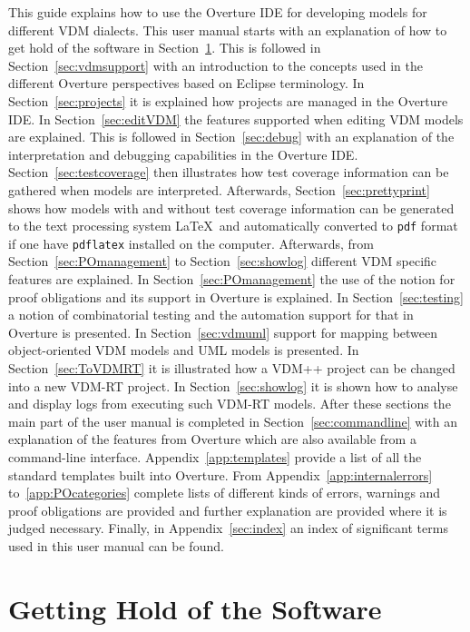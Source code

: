 \documentclass{overturerepsec}
\begin{document}
This guide explains how to use the Overture IDE for developing models
for different VDM dialects. This user manual starts with an explanation
of how to get hold of the software in
Section~\ref{sec:install}. This is followed in
Section~\ref{sec:vdmsupport} with an introduction to the concepts used
in the different Overture perspectives based on Eclipse
terminology. In Section~\ref{sec:projects} it is explained how
projects are managed in the Overture IDE. In Section~\ref{sec:editVDM}
the features supported when editing VDM models are explained. This is
followed in Section~\ref{sec:debug} with an explanation of the
interpretation and debugging capabilities in the Overture
IDE. Section~\ref{sec:testcoverage} then illustrates how test coverage
information can be gathered when models are interpreted. Afterwards,
Section~\ref{sec:prettyprint} shows how models with and without test
coverage information can be generated to the text processing system
\LaTeX\ and automatically converted to \texttt{pdf} format if one have
\texttt{pdflatex} installed on the computer. Afterwards, from
Section~\ref{sec:POmanagement} to Section~\ref{sec:showlog} different
VDM specific features are explained. In Section~\ref{sec:POmanagement}
the use of the notion for proof obligations and its support in
Overture is explained. In Section~\ref{sec:testing} a notion of
combinatorial testing and the automation support for that in Overture
is presented. In Section~\ref{sec:vdmuml} support for mapping between
object-oriented VDM models and UML models is presented. In
Section~\ref{sec:ToVDMRT} it is illustrated how a VDM++ project can be 
changed into a new VDM-RT project. In Section~\ref{sec:showlog} it
is shown how to analyse and display logs from executing
such VDM-RT models. After these sections the main part of the user
manual is completed in Section~\ref{sec:commandline} with an
explanation of the features from Overture which are also available from
a command-line interface. Appendix~\ref{app:templates} provide a list
of all the standard templates built into Overture. 
From Appendix~\ref{app:internalerrors}
to~\ref{app:POcategories} complete lists of different kinds of errors,
warnings and proof obligations are provided and further explanation
are provided where it is judged necessary.
Finally, in
Appendix~\ref{sec:index} an index of significant terms used in this
user manual can be found. 


\section{Getting Hold of the Software}\label{sec:install}
\end{document}
